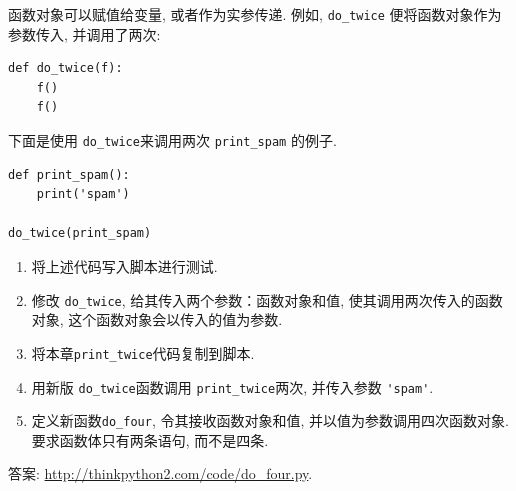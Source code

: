 \documentclass[10pt]{book}
\begin{document}
\begin{exercise}

函数对象可以赋值给变量, 或者作为实参传递. 
例如, \verb"do_twice" 便将函数对象作为参数传入, 并调用了两次:

\begin{verbatim}
def do_twice(f):
    f()
    f()
\end{verbatim}

下面是使用 \verb"do_twice"来调用两次 \verb"print_spam" 的例子. 

\begin{verbatim}
def print_spam():
    print('spam')

do_twice(print_spam)
\end{verbatim}

\begin{enumerate}

\item 将上述代码写入脚本进行测试.

\item 修改 \verb"do_twice", 给其传入两个参数：函数对象和值, 
使其调用两次传入的函数对象, 这个函数对象会以传入的值为参数.

\item 将本章\verb"print_twice"代码复制到脚本.

\item 用新版 \verb"do_twice"函数调用 \verb"print_twice"两次, 
并传入参数 \verb"'spam'".

\item 定义新函数\verb"do_four", 令其接收函数对象和值, 
并以值为参数调用四次函数对象. 
要求函数体只有两条语句, 而不是四条. 

\end{enumerate}

答案: \url{http://thinkpython2.com/code/do_four.py}.

\end{exercise}
\end{document}
